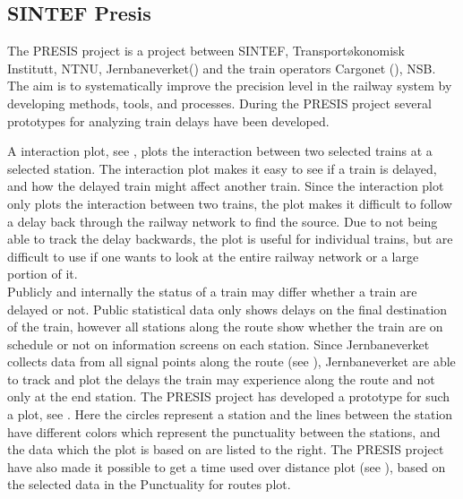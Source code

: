 \subsection{SINTEF Presis}
\label{sub:subsection_sintefPresis}

The PRESIS\cite{sintefPresis} project is a project between SINTEF\cite{sintef},
Transportøkonomisk Institutt\cite{transportOkonomiskInstitutt},
NTNU\cite{ntnu}, Jernbaneverket() 
and the train operators Cargonet (), NSB\cite{nsbForside}. The aim is to systematically improve the precision 
level in the railway system by developing methods, tools, and processes. During
the PRESIS project several prototypes for analyzing train delays have been 
developed.

A interaction plot, see , plots the interaction
between two selected trains at a selected station. The interaction plot makes 
it easy to see if a train is delayed, and how the delayed train might affect 
another train. Since the interaction plot only plots the interaction between 
two trains, the plot makes it difficult to follow a delay back through the 
railway network to find the source. Due to not being able to track the delay
backwards, the plot is useful for individual trains, but are difficult to use
if one wants to look at the entire railway network or a large portion of it. \\

Publicly and internally the status of a train may differ whether a train are 
delayed or not. Public statistical data only shows delays on the final 
destination of the train, however all stations along the route show whether 
the train are on schedule or not on information screens on each station. Since 
Jernbaneverket collects data from all signal points along the route (see 
), Jernbaneverket are able to track and 
plot the delays the train may experience along the route and not only at the 
end station. The PRESIS project has developed a prototype for such a plot, see 
. Here the circles represent a station and the lines 
between the station have different colors which represent the punctuality 
between the stations, and the data which the plot is based on are listed to 
the right. The PRESIS project have also made it possible to get a time used 
over distance plot (see ), based on the 
selected data in the Punctuality for routes plot. 

